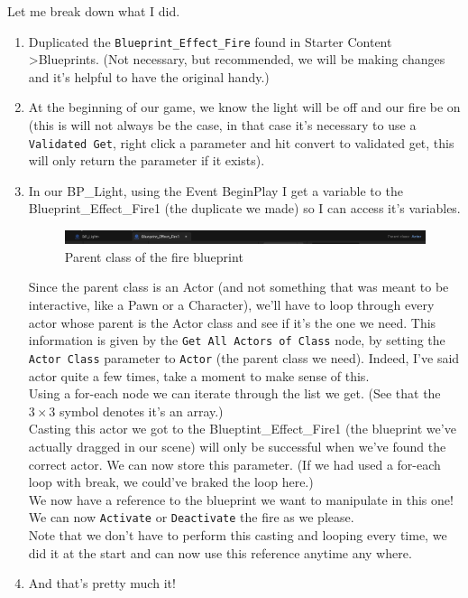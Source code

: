 \documentclass[]{article}
\begin{document}
	Let me break down what I did.
	\begin{enumerate}
		\item Duplicated the \verb*|Blueprint_Effect_Fire| found in Starter Content \textgreater Blueprints. (Not necessary, but recommended, we will be making changes and it's helpful to have the original handy.)
		\item At the beginning of our game, we know the light will be off and our fire be on (this is will not always be the case, in that case it's necessary to use a \verb*|Validated Get|, right click a parameter and hit convert to validated get, this will only return the parameter if it exists).
		\item In our BP\_Light, using the Event BeginPlay I get a variable to the Blueprint\_Effect\_Fire1 (the duplicate we made) so I can access it's variables. 
		\begin{figure}[h]
			\centering
			\includegraphics[width=1\linewidth]{week2part2/screenshot018}
			\caption{Parent class of the fire blueprint}
			\label{fig:screenshot018}
		\end{figure}
		Since the parent class is an Actor (and not something that was meant to be interactive, like a Pawn or a Character), we'll have to loop through every actor whose parent is the Actor class and see if it's the one we need. This information is given by the \verb|Get All Actors of Class| node, by setting the \verb|Actor Class| parameter to \verb*|Actor| (the parent class we need). Indeed, I've said actor quite a few times, take a moment to make sense of this.\\[10pt] Using a for-each node we can iterate through the list we get. (See that the $3\times3$ symbol denotes it's an array.)\\[10pt] Casting this actor we got to the Blueptint\_Effect\_Fire1 (the blueprint we've actually dragged in our scene) will only be successful when we've found the correct actor. We can now store this parameter. (If we had used a for-each loop with break, we could've braked the loop here.) \\[10pt] We now have a reference to the blueprint we want to manipulate in this one! We can now \verb*|Activate| or \verb*|Deactivate| the fire as we please.\\[10pt] Note that we don't have to perform this casting and looping every time, we did it at the start and can now use this reference anytime any where.
		\item And that's pretty much it!
	\end{enumerate}
	
\end{document}
